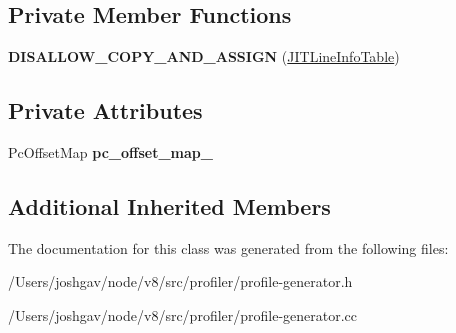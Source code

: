 \subsection*{Private Member Functions}
\begin{DoxyCompactItemize}
\item 
{\bfseries D\+I\+S\+A\+L\+L\+O\+W\+\_\+\+C\+O\+P\+Y\+\_\+\+A\+N\+D\+\_\+\+A\+S\+S\+I\+GN} (\hyperlink{classv8_1_1internal_1_1_j_i_t_line_info_table}{J\+I\+T\+Line\+Info\+Table})\hypertarget{classv8_1_1internal_1_1_j_i_t_line_info_table_a279a3a818c86cf44852ce3cdcf3bc112}{}\label{classv8_1_1internal_1_1_j_i_t_line_info_table_a279a3a818c86cf44852ce3cdcf3bc112}

\end{DoxyCompactItemize}
\subsection*{Private Attributes}
\begin{DoxyCompactItemize}
\item 
Pc\+Offset\+Map {\bfseries pc\+\_\+offset\+\_\+map\+\_\+}\hypertarget{classv8_1_1internal_1_1_j_i_t_line_info_table_af80662971d39b0d2b252f60b1fcde44f}{}\label{classv8_1_1internal_1_1_j_i_t_line_info_table_af80662971d39b0d2b252f60b1fcde44f}

\end{DoxyCompactItemize}
\subsection*{Additional Inherited Members}


The documentation for this class was generated from the following files\+:\begin{DoxyCompactItemize}
\item 
/\+Users/joshgav/node/v8/src/profiler/profile-\/generator.\+h\item 
/\+Users/joshgav/node/v8/src/profiler/profile-\/generator.\+cc\end{DoxyCompactItemize}
